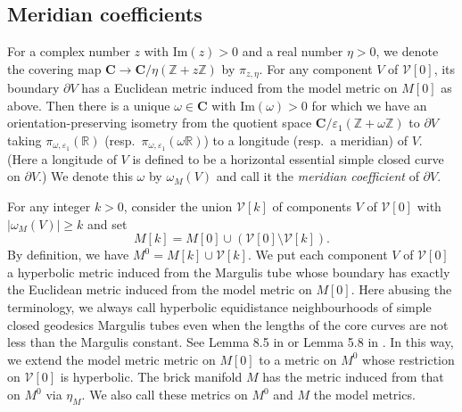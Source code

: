 \documentclass{amsart}
\theoremstyle{definition}
\numberwithin{figure}{section}
\numberwithin{equation}{section}
\newcommand{\blackboard}[1]{\ensuremath{\mathbb{#1}}}
\newcommand{\integers}{\blackboard{Z}} %
\newcommand{\reals}{\blackboard{R}}
\def\zz{\integers}
\def\rr{\reals}
\def\cv{\mathcal{V}}
\def\part{\partial}
\def\ve{\varepsilon}
\def\ve{\varepsilon}
\begin{document}
\subsection{Meridian coefficients}
For a complex number $z$ with $\mathrm{Im}(z)>0$ and a real number $\eta>0$, we denote the covering map 
$\mathbf{C}\rightarrow \mathbf{C}/\eta(\zz+z\zz)$ by $\pi_{z,\eta}$. 
For any component $V$ of $\cv[0]$, its boundary $\part V$ has a Euclidean metric induced from 
the model metric on $M[0]$ as above.
Then there is a unique $\omega\in \mathbf{C}$ with 
$\mathrm{Im}(\omega)>0$ for which we have an 
orientation-preserving isometry from the quotient space $\mathbf{C}/\ve_1(\zz+\omega\zz)$ to $\part V$ taking $\pi_{\omega,\ve_1}(\rr)$ (resp.\ $\pi_{\omega,\ve_1}(\omega\rr)$) to a longitude (resp.\ a meridian) of $V$.
(Here a longitude of $V$ is defined to be a horizontal essential simple closed curve on $\partial V$.)
We denote this $\omega$ by $\omega_M(V)$ and call it the \emph{meridian coefficient} of $\part V$.

For any integer $k>0$, consider the union $\cv[k]$ of components $V$ of $\cv[0]$ with $|\omega_M(V)|\geq k$ and 
set
$$M[k]=M[0]\cup (\cv[0]\setminus \cv[k]).$$
By definition, we have $M^0 =M[k] \cup \cv[k]$.
We put each component $V$ of $\cv[0]$ a hyperbolic metric induced from the Margulis tube whose boundary has  exactly the Euclidean metric  induced from  the model metric on $M[0]$.
Here abusing the terminology, we always call hyperbolic equidistance neighbourhoods of simple closed geodesics Margulis tubes even when the lengths of the core curves are not less than the Margulis constant.
See Lemma 8.5  in \cite{bcm} or Lemma 5.8 in \cite{bow3}.
In this way, we extend the model metric metric on $M[0]$ to a metric on $M^0$ whose restriction on 
$\cv[0]$ is hyperbolic.
The brick manifold $M$ has the metric induced from that on $M^0$ via $\eta_M$.
We also call these metrics on $M^0$ and $M$ the model metrics.
\end{document}
